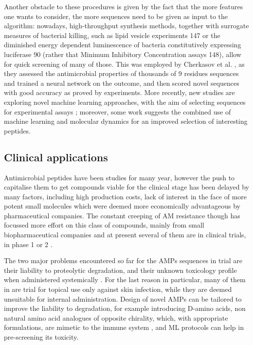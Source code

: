 Another obstacle to these procedures is given by the fact that the more features one wants to consider, the more sequences need to be given as input to the algorithm: nowadays, high-throughput synthesis methods, together with surrogate measures of bacterial killing, such as lipid vesicle experiments 147 or the diminished energy ­dependent luminescence of bacteria constitutively expressing luciferase 90 (rather that Minimum Inhibitory Concentration assays 148), allow for quick screening of many of those.
%
This was employed by Cherkasov et al. \cite{Cherkasov2009}, as they assessed the antimicrobial properties of thousands of 9 residues sequences and trained a neural network on the outcome, and then scored novel sequences with good accuracy as proved by experiments.
More recently, new studies are exploring novel machine learning approaches, with the aim of selecting sequences for experimental assays \cite{Lee2017}; moreover, some work suggests the combined use of machine learning and molecular dynamics for an improved selection of interesting peptides.


\subsection{Clinical applications}
Antimicrobial peptides have been studies for many year, however the push to capitalise them to get compounds viable for the clinical stage has been delayed by many factors, including high production costs, lack of interest in the face of more potent small molecules which were deemed more economically advantageous by pharmaceutical companies.
%
The constant creeping of AM resistance though has focussed more effort on this class of compounds, mainly from small biopharmaceutical companies and at present several of them are in clinical trials, in phase 1 or 2 \cite{Naafs2018}.

The two major problems encountered so far for the AMPs sequences in trial are their liability to proteolytic degradation, and their unknown toxicology profile when administered systemically \cite{2_fjell}. For the last reason in particular, many of them in are trial for topical use only against skin infection, while they are deemed unsuitable for internal administration.
%
Design of novel AMPs can be tailored to improve the liability to degradation, for example introducing D-amino acids, non ­natural amino ­acid analogues of opposite chirality, which, with appropriate formulations, are mimetic to the immune system \cite{160,161_fjell}, and ML protocols can help in pre-screening its toxicity. 

